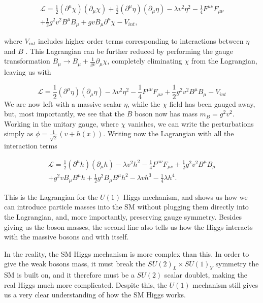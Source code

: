 \documentclass[EPJ,twocolumn]{webofc}
\begin{document}
\begin{multline}
    \mathcal{L} = \frac{1}{2}\left(\partial^{\mu}\chi\right)\left(\partial_{\mu}\chi\right)+\frac{1}{2}\left(\partial^{\mu}\eta\right)\left(\partial_{\mu}\eta\right)-\lambda v^2 \eta^2 
-\frac{1}{4}F^{\mu\nu}F_{\mu\nu}\\ +\frac{1}{2}g^2v^2B^{\mu}B_{\mu}+gvB_{\mu}\partial^{\mu}\chi-V_{int},
\end{multline}


where $V_{int}$ includes higher order terms corresponding to interactions between $\eta$ and $B$ . This Lagrangian can be further reduced by performing the gauge transformation $B_{\mu}\rightarrow B_{\mu}+\frac{1}{gv}\partial_{\mu}\chi$, completely eliminating $\chi$ from the Lagrangian, leaving us with 

\begin{equation}
    \mathcal{L} = \frac{1}{2}\left(\partial^{\mu}\eta\right)\left(\partial_{\mu}\eta\right)-\lambda v^2 \eta^2 
-\frac{1}{4}F^{\mu\nu}F_{\mu\nu} 
+\frac{1}{2}g^2v^2B^{\mu}B_{\mu}-V_{int}
\end{equation}
We are now left with a massive scalar $\eta$, while the $\chi$ field has been gauged away, but, most importantly, we see that the $B$ boson now has mass $m_B = g^2v^2$. Working in the unitary gauge, where $\chi$ vanishes, we can write the perturbations simply as $\phi = \frac{1}{\sqrt{2}}\left( v + h(x)\right)$. Writing now the Lagrangian with all the interaction terms

\begin{multline}
    \mathcal{L} = \frac{1}{2}\left(\partial^{\mu}h\right)\left(\partial_{\mu}h\right)-\lambda v^2 h^2 
-\frac{1}{4}F^{\mu\nu}F_{\mu\nu}+\frac{1}{2}g^2v^2B^{\mu}B_{\mu} \\ +
g^2vB_{\mu}B^{\mu}h+\frac{1}{2}g^2B_{\mu}B^{\mu}h^2-\lambda vh^3-\frac{1}{4}\lambda h^4.
\end{multline}
    


This is the Lagrangian for the $U(1)$ Higgs mechanism, and shows us how we can introduce particle masses into the SM without plugging them directly into the Lagrangian, and, more importantly, preserving gauge symmetry. Besides giving us the boson masses, the second line also tells us how the Higgs interacts with the massive bosons and with itself.

In the reality, the SM Higgs mechanism is more complex than this. In order to give the weak bosons mass, it must break the $SU(2)_L\times SU(1)_Y$ symmetry the SM is built on, and it therefore must be a $SU(2)$ scalar doublet,  making the real Higgs much more complicated. Despite this, the $U(1)$ mechanism still gives us a very clear understanding of how the SM Higgs works.
\end{document}
